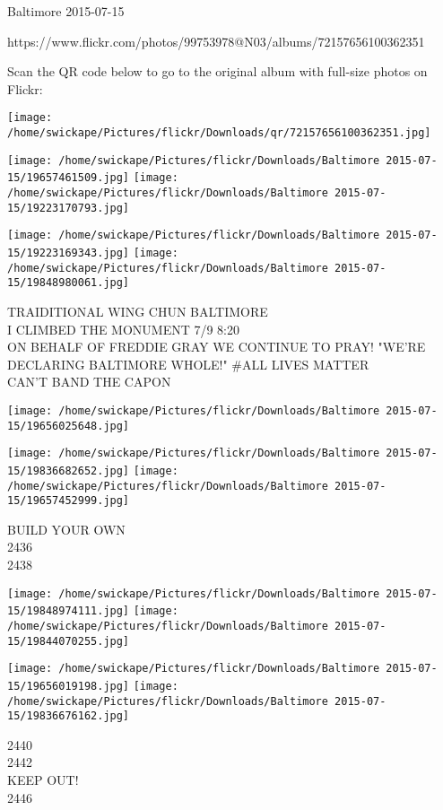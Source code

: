 \documentclass[10pt,letterpaper]{article}
\begin{document}
Baltimore 2015-07-15

https://www.flickr.com/photos/99753978@N03/albums/72157656100362351

Scan the QR code below to go to the original album with full-size photos on Flickr:

\texttt{[image: /home/swickape/Pictures/flickr/Downloads/qr/72157656100362351.jpg]}
\pagebreak

\texttt{[image: /home/swickape/Pictures/flickr/Downloads/Baltimore 2015-07-15/19657461509.jpg]}
\texttt{[image: /home/swickape/Pictures/flickr/Downloads/Baltimore 2015-07-15/19223170793.jpg]}

\texttt{[image: /home/swickape/Pictures/flickr/Downloads/Baltimore 2015-07-15/19223169343.jpg]}
\texttt{[image: /home/swickape/Pictures/flickr/Downloads/Baltimore 2015-07-15/19848980061.jpg]}

TRAIDITIONAL WING CHUN BALTIMORE\\
I CLIMBED THE MONUMENT 7/9 8:20\\
ON BEHALF OF FREDDIE GRAY WE CONTINUE TO PRAY!  "WE'RE DECLARING BALTIMORE WHOLE!"  \#ALL LIVES MATTER\\
CAN'T BAND THE CAPON\\
\pagebreak

\texttt{[image: /home/swickape/Pictures/flickr/Downloads/Baltimore 2015-07-15/19656025648.jpg]}

\vspace{0.25in}
\texttt{[image: /home/swickape/Pictures/flickr/Downloads/Baltimore 2015-07-15/19836682652.jpg]}
\texttt{[image: /home/swickape/Pictures/flickr/Downloads/Baltimore 2015-07-15/19657452999.jpg]}

BUILD YOUR OWN\\
2436\\
2438\\
\pagebreak

\texttt{[image: /home/swickape/Pictures/flickr/Downloads/Baltimore 2015-07-15/19848974111.jpg]}
\texttt{[image: /home/swickape/Pictures/flickr/Downloads/Baltimore 2015-07-15/19844070255.jpg]}

\texttt{[image: /home/swickape/Pictures/flickr/Downloads/Baltimore 2015-07-15/19656019198.jpg]}
\texttt{[image: /home/swickape/Pictures/flickr/Downloads/Baltimore 2015-07-15/19836676162.jpg]}

2440\\
2442\\
KEEP OUT!\\
2446\\
\pagebreak
\end{document}
